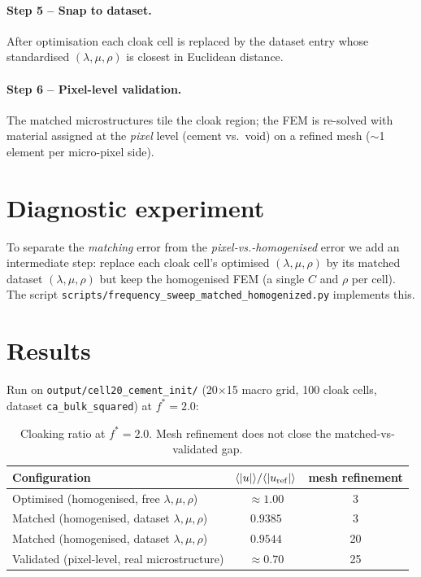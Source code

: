 \documentclass[11pt,a4paper]{article}
\begin{document}
\paragraph{Step 5 -- Snap to dataset.}
After optimisation each cloak cell is replaced by the dataset entry whose
standardised $(\lambda,\mu,\rho)$ is closest in Euclidean distance.

\paragraph{Step 6 -- Pixel-level validation.}
The matched microstructures tile the cloak region; the FEM is re-solved
with material assigned at the \emph{pixel} level (cement vs.\ void) on a
refined mesh ($\sim$1 element per micro-pixel side).

\section{Diagnostic experiment}
To separate the \emph{matching} error from the
\emph{pixel-vs.-homogenised} error we add an intermediate step: replace
each cloak cell's optimised $(\lambda,\mu,\rho)$ by its matched dataset
$(\lambda,\mu,\rho)$ but keep the homogenised FEM (a single $C$ and $\rho$
per cell). The script
\texttt{scripts/frequency\_sweep\_matched\_homogenized.py} implements this.

\section{Results}
Run on \texttt{output/cell20\_cement\_init/} (20$\times$15 macro grid,
100 cloak cells, dataset \texttt{ca\_bulk\_squared}) at $f^*=2.0$:

\begin{table}[h]
\centering
\begin{tabular}{lcc}
\toprule
Configuration & $\langle|u|\rangle/\langle|u_{\rm ref}|\rangle$ &
mesh refinement \\
\midrule
Optimised (homogenised, free $\lambda,\mu,\rho$) & $\approx 1.00$ & 3 \\
Matched (homogenised, dataset $\lambda,\mu,\rho$) & $0.9385$ & 3 \\
Matched (homogenised, dataset $\lambda,\mu,\rho$) & $0.9544$ & 20 \\
Validated (pixel-level, real microstructure)      & $\approx 0.70$ & 25 \\
\bottomrule
\end{tabular}
\caption{Cloaking ratio at $f^{*}=2.0$. Mesh refinement does not close the
matched-vs-validated gap.}
\end{table}
\end{document}
